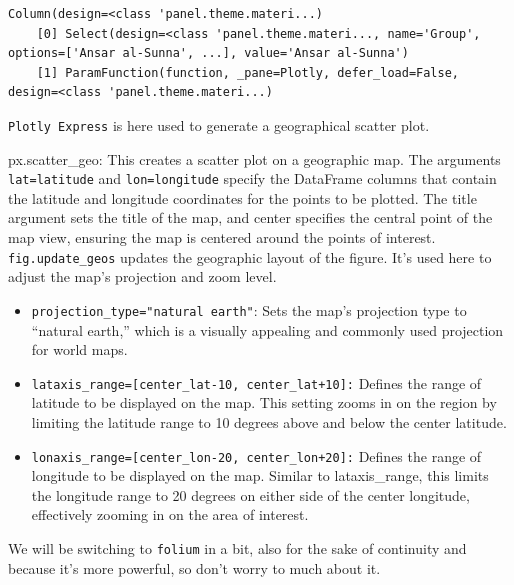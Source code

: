 \documentclass[
  letterpaper,
  DIV=11,
  numbers=noendperiod]{scrreprt}
\providecommand{\tightlist}{%
  \setlength{\itemsep}{0pt}\setlength{\parskip}{0pt}}\usepackage{longtable,booktabs,array}
\begin{document}
\begin{verbatim}
Column(design=<class 'panel.theme.materi...)
    [0] Select(design=<class 'panel.theme.materi..., name='Group', options=['Ansar al-Sunna', ...], value='Ansar al-Sunna')
    [1] ParamFunction(function, _pane=Plotly, defer_load=False, design=<class 'panel.theme.materi...)
\end{verbatim}

\texttt{Plotly\ Express} is here used to generate a geographical scatter
plot.

px.scatter\_geo: This creates a scatter plot on a geographic map. The
arguments \texttt{lat=\textquotesingle{}latitude\textquotesingle{}} and
\texttt{lon=\textquotesingle{}longitude\textquotesingle{}} specify the
DataFrame columns that contain the latitude and longitude coordinates
for the points to be plotted. The title argument sets the title of the
map, and center specifies the central point of the map view, ensuring
the map is centered around the points of interest.
\texttt{fig.update\_geos} updates the geographic layout of the figure.
It's used here to adjust the map's projection and zoom level.

\begin{itemize}
\tightlist
\item
  \texttt{projection\_type="natural\ earth"}: Sets the map's projection
  type to ``natural earth,'' which is a visually appealing and commonly
  used projection for world maps.
\item
  \texttt{lataxis\_range={[}center\_lat-10,\ center\_lat+10{]}:} Defines
  the range of latitude to be displayed on the map. This setting zooms
  in on the region by limiting the latitude range to 10 degrees above
  and below the center latitude.
\item
  \texttt{lonaxis\_range={[}center\_lon-20,\ center\_lon+20{]}:} Defines
  the range of longitude to be displayed on the map. Similar to
  lataxis\_range, this limits the longitude range to 20 degrees on
  either side of the center longitude, effectively zooming in on the
  area of interest.
\end{itemize}

We will be switching to \texttt{folium} in a bit, also for the sake of
continuity and because it's more powerful, so don't worry to much about
it.
\end{document}
